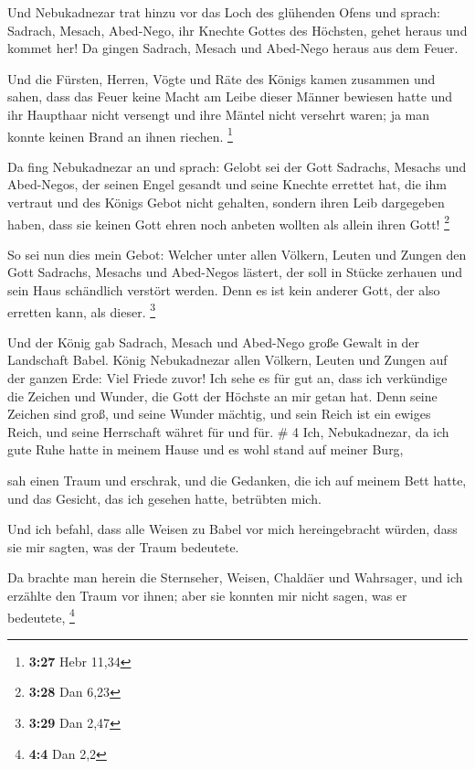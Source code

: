  Und Nebukadnezar trat hinzu vor das Loch des glühenden
Ofens und sprach: Sadrach, Mesach, Abed-Nego, ihr Knechte Gottes des
Höchsten, gehet heraus und kommet her! Da gingen Sadrach, Mesach und
Abed-Nego heraus aus dem Feuer.

 Und die Fürsten, Herren, Vögte und Räte des Königs kamen
zusammen und sahen, dass das Feuer keine Macht am Leibe dieser Männer
bewiesen hatte und ihr Haupthaar nicht versengt und ihre Mäntel nicht
versehrt waren; ja man konnte keinen Brand an ihnen riechen. \footnote{\textbf{3:27}
  Hebr 11,34}

 Da fing Nebukadnezar an und sprach: Gelobt sei der Gott
Sadrachs, Mesachs und Abed-Negos, der seinen Engel gesandt und seine
Knechte errettet hat, die ihm vertraut und des Königs Gebot nicht
gehalten, sondern ihren Leib dargegeben haben, dass sie keinen Gott
ehren noch anbeten wollten als allein ihren Gott! \footnote{\textbf{3:28}
  Dan 6,23}

 So sei nun dies mein Gebot: Welcher unter allen Völkern,
Leuten und Zungen den Gott Sadrachs, Mesachs und Abed-Negos lästert, der
soll in Stücke zerhauen und sein Haus schändlich verstört werden. Denn
es ist kein anderer Gott, der also erretten kann, als dieser.
\footnote{\textbf{3:29} Dan 2,47}

 Und der König gab Sadrach, Mesach und Abed-Nego große
Gewalt in der Landschaft Babel.  König Nebukadnezar allen
Völkern, Leuten und Zungen auf der ganzen Erde: Viel Friede zuvor!
 Ich sehe es für gut an, dass ich verkündige die Zeichen
und Wunder, die Gott der Höchste an mir getan hat.  Denn
seine Zeichen sind groß, und seine Wunder mächtig, und sein Reich ist
ein ewiges Reich, und seine Herrschaft währet für und für. \# 4
 Ich, Nebukadnezar, da ich gute Ruhe hatte in meinem Hause
und es wohl stand auf meiner Burg,

 sah einen Traum und erschrak, und die Gedanken, die ich
auf meinem Bett hatte, und das Gesicht, das ich gesehen hatte, betrübten
mich.

 Und ich befahl, dass alle Weisen zu Babel vor mich
hereingebracht würden, dass sie mir sagten, was der Traum bedeutete.

 Da brachte man herein die Sternseher, Weisen, Chaldäer
und Wahrsager, und ich erzählte den Traum vor ihnen; aber sie konnten
mir nicht sagen, was er bedeutete, \footnote{\textbf{4:4} Dan 2,2}

